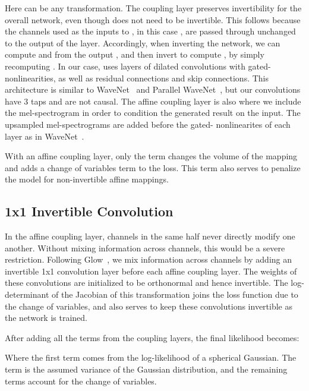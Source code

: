 Here  can be any transformation.  The coupling layer preserves invertibility for the overall network, even though  does not need to be invertible. This follows because the channels used as the inputs to , in this case , are passed through unchanged to the output of the layer. Accordingly, when inverting the network, we can compute  and  from the output , and then invert  to compute , by simply recomputing . In our case,  uses layers of dilated convolutions with gated- nonlinearities, as well as residual connections and skip connections.  This  architecture is similar to WaveNet~\cite{van2016wavenet} and Parallel WaveNet~\cite{van2018parallel}, but our convolutions have 3 taps and are not causal.  The affine coupling layer is also where we include the mel-spectrogram in order to condition the generated result on the input.  The upsampled mel-spectrograms are added before the gated- nonlinearites of each layer as in WaveNet~\cite{van2016wavenet}.

With an affine coupling layer, only the  term changes the volume of the mapping and adds a change of variables term to the loss. This term also serves to penalize the model for non-invertible affine mappings.


\subsection{1x1 Invertible Convolution}
In the affine coupling layer, channels in the same half never directly modify one another.  Without mixing information across channels, this would be a severe restriction. Following Glow~\cite{kingma2018glow}, we mix information across channels by adding an invertible 1x1 convolution layer before each affine coupling layer.  The  weights of these convolutions are initialized to be orthonormal and hence invertible. The log-determinant of the Jacobian of this transformation joins the loss function due to the change of variables, and also serves to keep these convolutions invertible as the network is trained.



After adding all the terms from the coupling layers, the final likelihood becomes:


Where the first term comes from the log-likelihood of a spherical Gaussian.  The  term is the assumed variance of the Gaussian distribution, and the remaining terms account for the change of variables.

